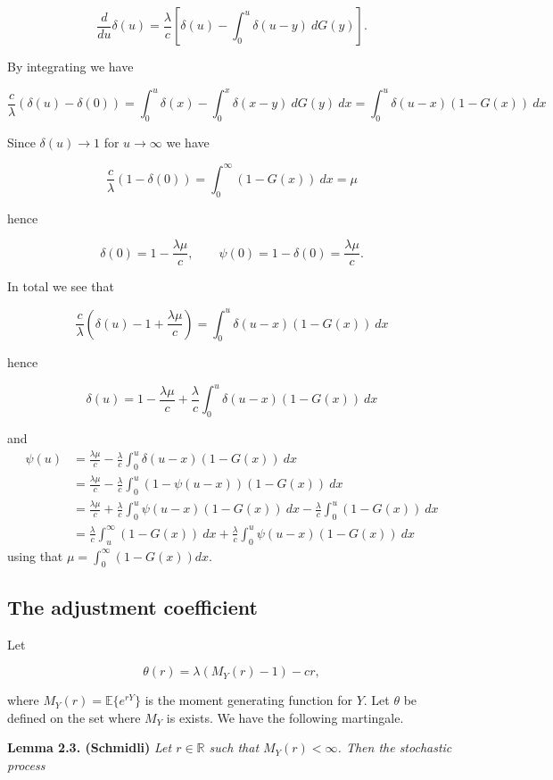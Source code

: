 \documentclass[a4paper,12pt,openany]{book}
\begin{document}
\[
\frac{d}{du}\delta(u)=\frac{\lambda}{c}\left[\delta(u)-\int_0^u\delta(u-y)\ dG(y)\right].
\]

By integrating we have

\[
\frac{c}{\lambda}(\delta(u)-\delta(0))=\int_0^u \delta(x)-\int_0^x\delta(x-y)\ dG(y)\ dx=\int_0^u\delta(u-x)(1-G(x))\ dx
\]

Since \(\delta(u)\to 1\) for \(u\to\infty\) we have

\[
\frac{c}{\lambda}(1-\delta(0))= \int_0^\infty(1-G(x))\ dx=\mu
\]

hence

\[
\delta(0)=1-\frac{\lambda\mu}{c},\qquad \psi(0)=1-\delta(0)=\frac{\lambda\mu}{c}.
\]

In total we see that

\[
\frac{c}{\lambda}\left(\delta(u)-1+\frac{\lambda\mu}{c}\right)=\int_0^u\delta(u-x)(1-G(x))\ dx
\]

hence

\[
\delta(u)=1-\frac{\lambda\mu}{c}+\frac{\lambda}{c}\int_0^u\delta(u-x)(1-G(x))\ dx
\]

and
\begin{align*}
\psi(u)&=\frac{\lambda\mu}{c}-\frac{\lambda}{c}\int_0^u\delta(u-x)(1-G(x))\ dx\\
&=\frac{\lambda\mu}{c}-\frac{\lambda}{c}\int_0^u(1-\psi(u-x))(1-G(x))\ dx\\
&=\frac{\lambda\mu}{c}+\frac{\lambda}{c}\int_0^u\psi(u-x)(1-G(x))\ dx-\frac{\lambda}{c}\int_0^u(1-G(x))\ dx\\
&=\frac{\lambda}{c}\int_u^\infty (1-G(x))\ dx+\frac{\lambda}{c}\int_0^u\psi(u-x)(1-G(x))\ dx
\end{align*}
using that \(\mu=\int_0^\infty (1-G(x)) dx\).

\hypertarget{the-adjustment-coefficient}{%
\subsection{The adjustment coefficient}\label{the-adjustment-coefficient}}

Let

\[
\theta(r)=\lambda(M_Y(r)-1)-cr,
\]

where \(M_Y(r)=\mathbb E\{e^{rY}\}\) is the moment generating function for \(Y\). Let \(\theta\) be defined on the set where \(M_Y\) is exists. We have the following martingale.

\textbf{Lemma 2.3. (Schmidli)} \emph{Let \(r\in\mathbb R\) such that \(M_Y(r)<\infty\). Then the stochastic process}
\end{document}
